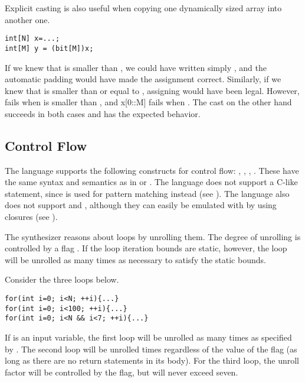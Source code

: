 \begin{Example}
Explicit casting is also useful when copying one dynamically sized array into another one.
\begin{lstlisting}
int[N] x=...;
int[M] y = (bit[M])x;
\end{lstlisting}
If we knew that  is smaller than , we could have written simply , and the automatic padding would have made the assignment correct. Similarly, if we knew that  is smaller than or equal to , assigning  would have been legal. However,  fails when  is smaller than , and x[0::M] fails when . The cast on the other hand succeeds in both cases and has the expected behavior.
\end{Example}

\subsection{Control Flow}
The language supports the following constructs for control flow: , , , . These have the same syntax and semantics as in  or . The language does not support a C-like  statement, since  is used for pattern matching instead (see ). The language also does not support  and , although they can easily be emulated with  by using closures (see ).

The synthesizer reasons about loops by unrolling them. The degree of unrolling is controlled by a flag . If the loop iteration bounds are static, however, the loop will be unrolled as many times as necessary to satisfy the static bounds.



\begin{Example}
Consider the three loops below.
\begin{lstlisting}
for(int i=0; i<N; ++i){...}
for(int i=0; i<100; ++i){...}
for(int i=0; i<N && i<7; ++i){...}
\end{lstlisting}
If  is an input variable, the first loop will be unrolled as many times as specified by . The second loop will be unrolled  times regardless of the value of the flag (as long as there are no return statements in its body). For the third loop, the unroll factor will be controlled by the flag, but will never exceed seven.
\end{Example}



